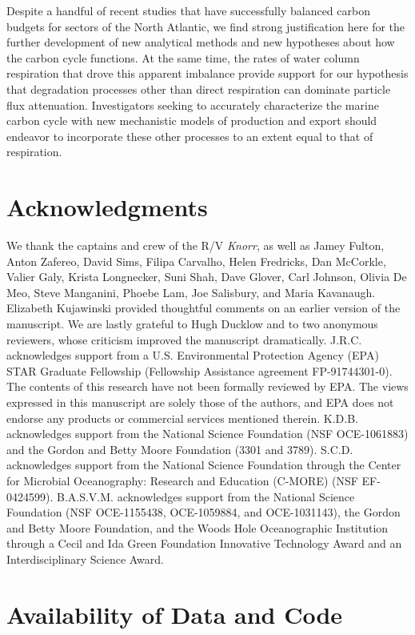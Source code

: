 Despite a handful of recent studies that have successfully balanced carbon budgets for sectors of the North Atlantic, we find strong justification here for the further development of new analytical methods and new hypotheses about how the carbon cycle functions. At the same time, the rates of water column respiration that drove this apparent imbalance provide support for our hypothesis that degradation processes other than direct respiration can dominate particle flux attenuation. Investigators seeking to accurately characterize the marine carbon cycle with new mechanistic models of production and export should endeavor to incorporate these other processes to an extent equal to that of respiration.

\section{Acknowledgments}

We thank the captains and crew of the R/V \emph{Knorr}, as well as Jamey Fulton, Anton Zafereo, David Sims, Filipa Carvalho, Helen Fredricks, Dan McCorkle, Valier Galy, Krista Longnecker, Suni Shah, Dave Glover, Carl Johnson, Olivia De Meo, Steve Manganini, Phoebe Lam, Joe Salisbury, and Maria Kavanaugh. Elizabeth Kujawinski provided thoughtful comments on an earlier version of the manuscript. We are lastly grateful to Hugh Ducklow and to two anonymous reviewers, whose criticism improved the manuscript dramatically. J.R.C. acknowledges support from a U.S. Environmental Protection Agency (EPA) STAR Graduate Fellowship (Fellowship Assistance agreement FP-91744301-0). The contents of this research have not been formally reviewed by EPA. The views expressed in this manuscript are solely those of the authors, and EPA does not endorse any products or commercial services mentioned therein. K.D.B. acknowledges support from the National Science Foundation (NSF OCE-1061883) and the Gordon and Betty Moore Foundation (3301 and 3789). S.C.D. acknowledges support from the National Science Foundation through the Center for Microbial Oceanography: Research and Education (C-MORE) (NSF EF-0424599). B.A.S.V.M. acknowledges support from the National Science Foundation (NSF OCE-1155438, OCE-1059884, and OCE-1031143), the Gordon and Betty Moore Foundation, and the Woods Hole Oceanographic Institution through a Cecil and Ida Green Foundation Innovative Technology Award and an Interdisciplinary Science Award.

\section{Availability of Data and Code }

